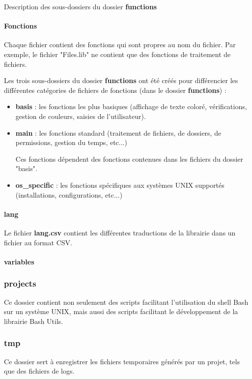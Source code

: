 \documentclass[a4paper,10pt]{article}
\begin{document}
Description des sous-dossiers du dossier \textbf{functions}
\setcounter{secnumdepth}{4}
\paragraph{Fonctions}
Chaque fichier contient des fonctions qui sont propres au nom du fichier. Par exemple, le fichier "Files.lib" ne contient que des fonctions de traitement de fichiers.

Les trois sous-dossiers du dossier \textbf{functions} ont été créés pour différencier les différentes catégories de fichiers de fonctions (dans le dossier \textbf{functions}) :
\begin{itemize}
    \item \textbf{basis} : les fonctions les plus basiques (affichage de texte coloré, vérifications, gestion de couleurs, saisies de l'utilisateur).
    
    \item \textbf{main} : les fonctions standard (traitement de fichiers, de dossiers, de permissions, gestion du temps, etc...)

    Ces fonctions dépendent des fonctions contenues dans les fichiers du dossier "basis".

    \item \textbf{os\_specific} : les fonctions spécifiques aux systèmes UNIX supportés (installations, configurations, etc...)
\end{itemize}

\paragraph{lang}
Le fichier \textbf{lang.csv} contient les différentes traductions de la librairie dans un fichier au format CSV.

\paragraph{variables}

\subsubsection{projects}
Ce dossier contient non seulement des scripts facilitant l'utilisation du shell Bash sur un système UNIX, mais aussi des scripts facilitant le développement de la librairie Bash Utils.

\subsubsection{tmp}
Ce dossier sert à enregistrer les fichiers temporaires générés par un projet, tels que des fichiers de logs.
\end{document}
